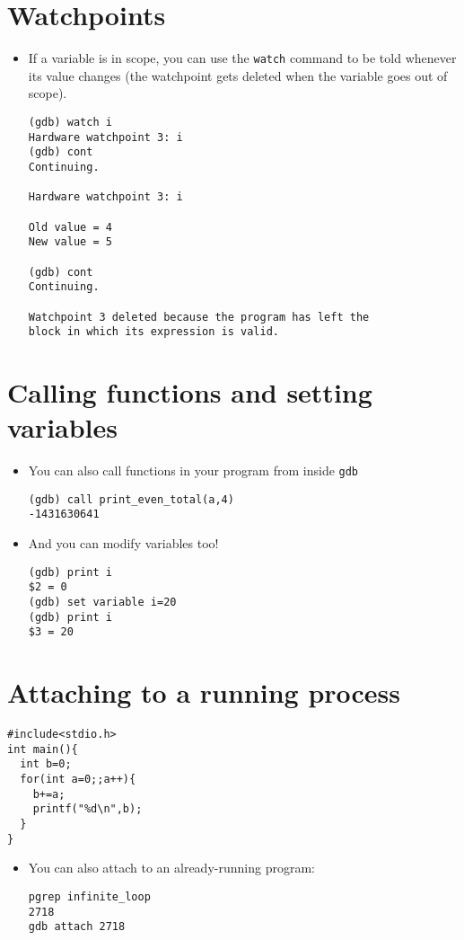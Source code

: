 \documentclass{article}
\begin{document}
\section{Watchpoints}
\begin{itemize}
\item If a variable is in scope, you can use the \verb!watch! command to be told whenever its value changes (the watchpoint gets deleted when the variable goes out of scope).
\begin{verbatim}
(gdb) watch i
Hardware watchpoint 3: i
(gdb) cont
Continuing.

Hardware watchpoint 3: i

Old value = 4
New value = 5

(gdb) cont
Continuing.

Watchpoint 3 deleted because the program has left the
block in which its expression is valid.
\end{verbatim}
\end{itemize}



\section{Calling functions and setting variables}
\begin{itemize}
\item You can also call functions in your program from inside \verb!gdb!
\begin{verbatim}
(gdb) call print_even_total(a,4)
-1431630641
\end{verbatim}
\item And you can modify variables too!
\begin{verbatim}
(gdb) print i
$2 = 0
(gdb) set variable i=20
(gdb) print i
$3 = 20
\end{verbatim}
\end{itemize}



\section{Attaching to a running process}
\begin{verbatim}
#include<stdio.h>
int main(){
  int b=0;
  for(int a=0;;a++){
    b+=a;
    printf("%d\n",b);
  }
}
\end{verbatim}

\begin{itemize}
\item You can also attach to an already-running program:
\begin{verbatim}
pgrep infinite_loop
2718
gdb attach 2718
\end{verbatim}
\end{itemize}
\end{document}
